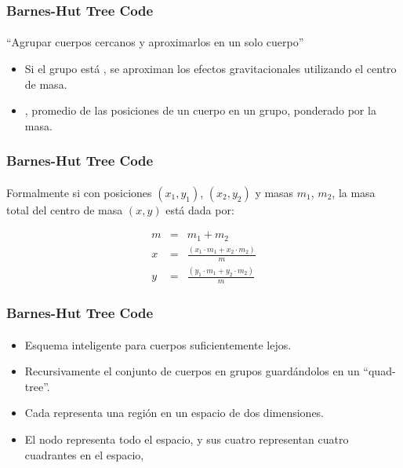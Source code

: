 \frame
{
\frametitle{Barnes-Hut Tree Code}
\framesubtitle{}

\begin{center}
``Agrupar cuerpos cercanos y aproximarlos en un solo cuerpo''
\end{center}

\begin{itemize}
	\item<2-> Si el grupo está , se aproximan los efectos gravitacionales
		 utilizando el centro de masa.
	\item<3-> , promedio de las posiciones de un cuerpo en un grupo,
		 ponderado por la masa.
\end{itemize}
}

\frame
{
\frametitle{Barnes-Hut Tree Code}
\framesubtitle{}


\begin{center}
Formalmente si  con posiciones $(x_{1},y_{1})$, $(x_{2},y_{2})$ y
masas $m_{1}$, $m_{2}$, la masa total del centro de masa $(x,y)$ está dada por:
\end{center}

\begin{eqnarray}
	m &=& m_{1} + m_{2} \nonumber \\
	x &=& \frac{(x_{1}\cdot m_{1} + x_{2}\cdot m_{2})}{m} \nonumber \\
	y &=& \frac{(y_{1}\cdot m_{1} + y_{2}\cdot m_{2})}{m} \nonumber 
\end{eqnarray}

}

\frame
{
\frametitle{Barnes-Hut Tree Code}
\framesubtitle{}

\begin{itemize}
	\item<1-> Esquema inteligente para  cuerpos suficientemente lejos.
	\item<2-> Recursivamente  el conjunto de cuerpos en grupos
	          guardándolos en un ``quad-tree''.
	\item<3-> Cada  representa una región en un espacio de dos dimensiones.
	\item<4-> El nodo  representa todo el espacio,
		y sus cuatro  representan cuatro cuadrantes en el espacio,
\end{itemize}
}

